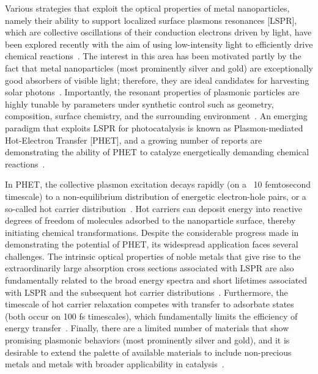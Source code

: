 \documentclass[journal=jpclcd,manuscript=article]{achemso}
\begin{document}

Various strategies that exploit the optical properties of metal nanoparticles, namely their ability to support localized surface plasmons resonances [LSPR], 
which are collective oscillations of their 
conduction electrons driven by light, have been explored recently with the aim of using low-intensity light to efficiently drive chemical 
reactions~\cite{LCI_NatureMater_2011,KAC_ACSCatalysis_2013,ZLQ_RSCAdvances_2015,PKL_AccChemRes_2015}.  The interest in this area has 
been motivated partly by the fact that metal nanoparticles (most prominently silver and gold) are exceptionally good absorbers of visible light; therefore,
they are ideal candidates for harvesting solar photons~\cite{AP_NatMat_2010}.  
Importantly, the resonant properties of plasmonic particles are highly tunable by parameters under synthetic control such as geometry, composition, surface chemistry, and the surrounding 
environment~\cite{SX_Science_2002,BCN_ChemRev_2005,GB_NatPhoton_2010}.  An emerging paradigm that exploits LSPR for photocatalysis is known as Plasmon-mediated Hot-Electron Transfer [PHET],
and a growing number of reports are demonstrating the ability of PHET to catalyze energetically demanding chemical 
reactions~\cite{CXL_NatureChem_2011,MZL_Science_2013,MLL_NanoLett_2013,LFP_AC_2015,ZHX_NatPhoton_2016,ZJM_ACSNano_2016,SZZ_PNAS_2016,SCR_JPCC_2016}.

In PHET, the collective plasmon excitation decays rapidly (on a ~10 femtosecond timescale) to a non-equilibrium distribution of energetic electron-hole pairs, or a so-called hot carrier 
distribution~\cite{KAC_ACSCatalysis_2013,GZG_JPCC_2013,SNJ_NatComm_2014,WCM_Science_2015,MWW_NatComm_2015, BSN_ACSNano_2016}.  
Hot carriers can deposit energy into reactive degrees of freedom of molecules adsorbed 
to the nanoparticle surface, thereby initiating chemical transformations.  Despite 
the considerable progress made in 
demonstrating the potential of PHET, its widespread application 
faces several challenges. The intrinsic optical properties of noble metals that 
give rise to the extraordinarily 
large absorption cross sections associated with LSPR are also fundamentally 
related to the broad energy spectra and short lifetimes associated with LSPR 
and the subsequent hot carrier 
distributions~\cite{KS_JCP_1983}. 
Furthermore, the timescale of hot carrier relaxation competes 
with transfer to adsorbate states (both occur on 100 fs timescales), which fundamentally limits the efficiency of energy transfer~\cite{WCM_Science_2015}.  Finally, there are a limited number of materials that show promising plasmonic
behaviors (most prominently silver and gold), and it is desirable to extend the palette of available materials to include
non-precious metals and metals with broader applicability in catalysis~\cite{SZZ_PNAS_2016}.
\end{document}
